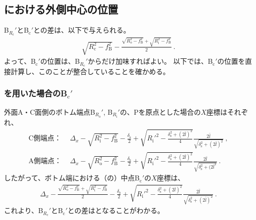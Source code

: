 \subsection{\BottomEndFace における外側中心の位置}
\BottomCurvatureCenter B$_{R_\mathrm c}'$と\BottomODCenter B$_\mathrm c'$との差は、以下で与えられる。
\begin{align}
  \label{eq:BRc-Bc}
  \sqrt{R_\mathrm c^2-f_\mathrm B^2}
  -\frac{\sqrt{R_\mathrm o^2-f_\mathrm B^2}+\sqrt{R_\mathrm i^2-f_\mathrm B^2}}2\ .
\end{align}
よって、\BottomODCenter B$_\mathrm c'$の位置は、\BottomCurvatureCenter B$_{R_\mathrm c}'$からだけ加味すればよい。
以下では、\BottomODCenter B$_\mathrm c'$の位置を直接計算し、このことが整合していることを確かめる。

\subsubsection{\Spacer を用いた場合のB\texorpdfstring{$_\mathrm c'$}{c'}}
外面A・C面側のボトム端点B$_{R_\mathrm o}'$, B$_{R_\mathrm i}'$の、\TableCenter Pを原点とした場合の$X$座標はそれぞれ、
\begin{align*}
  \text{C側端点：}&~~
  \Delta_x-\sqrt{R_\mathrm i^2-f_\mathrm B^2}-\frac{\delta_\mathrm s}2+\sqrt{R_\mathrm i'^2-\frac{\delta_\mathrm s^2+(2\bar l)^2}4}\frac{2\bar l}{\sqrt{\delta_\mathrm s^2+(2\bar l)^2}}\ ,\\
  \text{A側端点：}&~~
  \Delta_x-\sqrt{R_\mathrm o^2-f_\mathrm B^2}-\frac{\delta_\mathrm s}2+\sqrt{R_\mathrm i'^2-\frac{\delta_\mathrm s^2+(2\bar l)^2}4}\frac{2\bar l}{\sqrt{\delta_\mathrm s^2+(2\bar l^2}}\ .
\end{align*}
したがって、ボトム端における（\ACOD の）中点B$_\mathrm c'$の$X$座標は、
\begin{align}
  \label{eq:spacerBc}
  \Delta_x-\frac{\sqrt{R_\mathrm o^2-f_\mathrm B^2}+\sqrt{R_\mathrm i^2-f_\mathrm B^2}}2
  -\frac{\delta_\mathrm s}2+\sqrt{R_\mathrm i'^2-\frac{\delta_\mathrm s^2+(2\bar l)^2}4}\frac{2\bar l}{\sqrt{\delta_\mathrm s^2+(2\bar l)^2}}\ .
\end{align}
これより、\BottomCurvatureCenter B$_{R_\mathrm c}'$と\BottomODCenter B$_\mathrm c'$との差はとなることがわかる。

\clearpage
